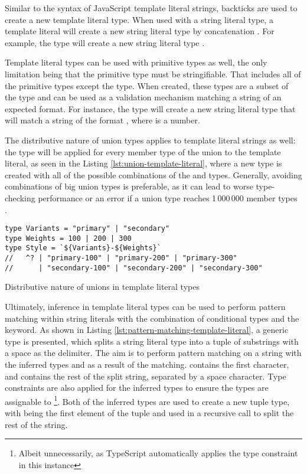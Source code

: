 Similar to the syntax of JavaScript template literal strings, backticks are used to create a new template literal type. When used with a string literal type, a template literal will create a new string literal type by concatenation \cite{DocumentationTemplateLiteral}. For example, the type  will create a new string literal type .

Template literal types can be used with primitive types as well, the only limitation being that the primitive type must be stringifiable. That includes all of the primitive types except the  type. When created, these types are a subset of the  type and can be used as a validation mechanism matching a string of an expected format. For instance, the type  will create a new string literal type that will match a string of the format , where  is a number.

The distributive nature of union types applies to template literal strings as well: the type will be applied for every member type of the union to the template literal, as seen in the Listing \ref{lst:union-template-literal}, where a new  type is created with all of the possible combinations of the  and  types. Generally, avoiding combinations of big union types is preferable, as it can lead to worse type-checking performance or an error if a union type reaches 1\,000\,000 member types \cite{ImplementationCheckerTs2023}.

\begin{listing}[ht]
  \begin{verbatim}
type Variants = "primary" | "secondary"
type Weights = 100 | 200 | 300
type Style = `${Variants}-${Weights}`
//   ^? | "primary-100" | "primary-200" | "primary-300" 
//      | "secondary-100" | "secondary-200" | "secondary-300"
\end{verbatim}
  \caption{Distributive nature of unions in template literal types}\label{lst:union-template-literal}
\end{listing}

\clearpage

Ultimately, inference in template literal types can be used to perform pattern matching within string literals with the combination of conditional types and the  keyword. As shown in Listing \ref{lst:pattern-matching-template-literal}, a generic type  is presented, which splits a string literal type into a tuple of substrings with a space as the delimiter. The aim is to perform pattern matching on a string with the inferred types  and  as a result of the matching.  contains the first character, and  contains the rest of the split string, separated by a space character. Type constraints are also applied for the inferred types to ensure the types are assignable to \footnote{Albeit unnecessarily, as TypeScript automatically applies the  type constraint in this instance}. Both of the inferred types are used to create a new tuple type, with  being the first element of the tuple and  used in a recursive call to split the rest of the string.

